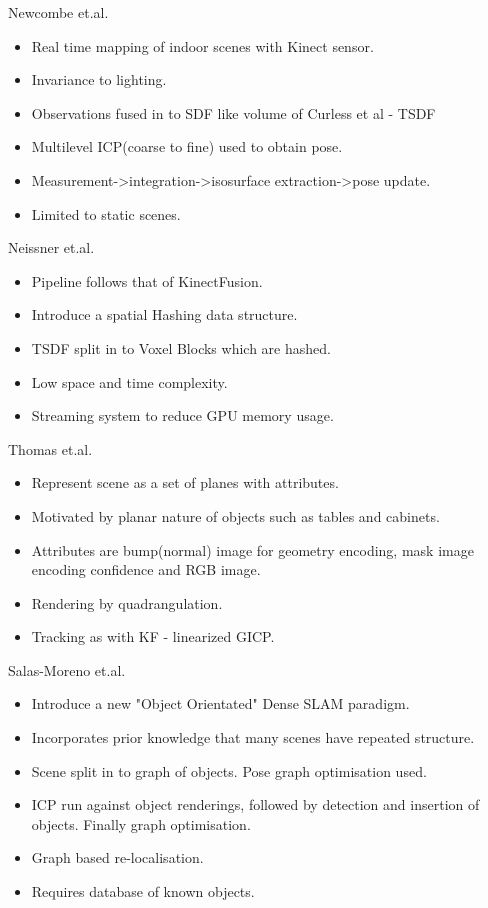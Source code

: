 Newcombe et.al. \cite{Newcombe2011}
\begin{itemize}
	\item Real time mapping of indoor scenes with Kinect sensor.
	\item Invariance to lighting.
	\item Observations fused in to SDF like volume of Curless et al - TSDF
	\item Multilevel ICP(coarse to fine) used to obtain pose.
	\item Measurement->integration->isosurface extraction->pose update.
	\item Limited to static scenes.
\end{itemize}

Neissner et.al. \cite{NieBner2013}
\begin{itemize}
	\item Pipeline follows that of KinectFusion.
	\item Introduce a spatial Hashing data structure.
	\item TSDF split in to Voxel Blocks which are hashed.
	\item Low space and time complexity.
	\item Streaming system to reduce GPU memory usage.
\end{itemize}

Thomas et.al. \cite{Thomas2013}
\begin{itemize}
	\item Represent scene as a set of planes with attributes.
	\item Motivated by planar nature of objects such as tables and cabinets.
	\item Attributes are bump(normal) image for geometry encoding, mask image encoding confidence and RGB image.
	\item Rendering by quadrangulation. %
	\item Tracking as with KF - linearized GICP.
\end{itemize}

Salas-Moreno et.al. \cite{Salas-Moreno2013}
\begin{itemize}
	\item Introduce a new "Object Orientated" Dense SLAM paradigm.
	\item Incorporates prior knowledge that many scenes have repeated structure.
	\item Scene split in to graph of objects. Pose graph optimisation used.
	\item ICP run against object renderings, followed by detection and insertion of objects. Finally graph optimisation.
	\item Graph based re-localisation.
	\item Requires database of known objects.
\end{itemize}

